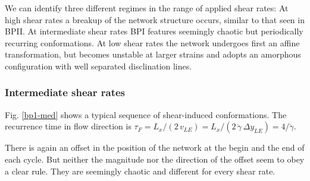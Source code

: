 \documentclass[aps,pre,reprint,superscriptaddress]{revtex4}
\newcommand{\gd}{\dot{\gamma}}
\begin{document}
We can identify three different regimes in the range of applied shear rates:
At high shear rates a breakup of the network structure occurs, similar to that seen in BPII. 
At intermediate shear rates BPI features seemingly chaotic but periodically recurring conformations.
At low shear rates the network undergoes first an affine transformation, but becomes unstable
at larger strains and adopts an amorphous configuration with well separated disclination lines.

\subsubsection{Intermediate shear rates}

Fig. \ref{bp1-med} shows a typical sequence of shear-induced conformations.
The recurrence time in flow direction is $\tau_F=L_x/(2\, v_{LE})=L_x/(2\,\gd\, \Delta y_{LE})= 4/\gd$.


There is again an offset in the position of the network at the begin and the end of each cycle. 
But neither the magnitude nor the direction of the offset seem to obey a clear rule.
They are seemingly chaotic and different for every shear rate. 
\end{document}
